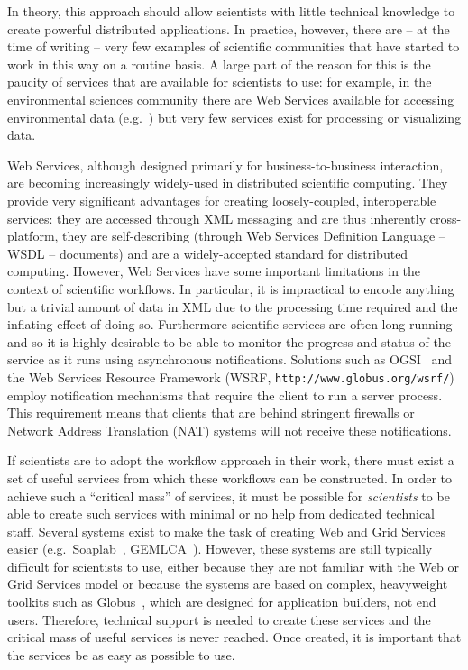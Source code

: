 \documentclass{llncs}
\begin{document}
In theory, this approach should allow scientists with little technical knowledge to create powerful distributed applications.  In practice, however, there are -- at the time of writing -- very few examples of scientific communities that have started to work in this way on a routine basis.  A large part of the reason for this is the paucity of services that are available for scientists to use: for example, in the environmental sciences community there are Web Services available for accessing environmental data (e.g.\ \cite{Woolf:2003}) but very few services exist for processing or visualizing data.

Web Services, although designed primarily for business-to-business interaction, are becoming increasingly widely-used in distributed scientific computing.  They provide very significant advantages for creating loosely-coupled, interoperable services: they are accessed through XML messaging and are thus inherently cross-platform, they are self-describing (through Web Services Definition Language -- WSDL -- documents) and are a widely-accepted standard for distributed computing.  However, Web Services have some important limitations in the context of scientific workflows. In particular, it is impractical to encode anything but a trivial amount of data in XML due to the processing time required and the inflating effect of doing so. Furthermore scientific services are often long-running and so it is highly desirable to be able to monitor the progress and status of the service as it runs using asynchronous notifications. Solutions such as OGSI~\cite{ogsi} and the Web Services Resource Framework (WSRF, {\tt http://www.globus.org/wsrf/}) employ notification mechanisms that require the client to run a server process. This requirement means that clients that are behind stringent firewalls or Network Address Translation (NAT) systems will not receive these notifications.

If scientists are to adopt the workflow approach in their work, there must exist a set of useful services from which these workflows can be constructed.  In order to achieve such a ``critical mass'' of services, it must be possible for {\em scientists\/} to be able to create such services with minimal or no help from dedicated technical staff.  Several systems exist to make the task of creating Web and Grid Services easier (e.g.\ Soaplab~\cite{soaplab}, GEMLCA~\cite{gemlca}).  However, these systems are still typically difficult for scientists to use, either because they are not familiar with the Web or Grid Services model or because the systems are based on complex, heavyweight toolkits such as Globus~\cite{globustoolkit}, which are designed for application builders, not end users.  Therefore, technical support is needed to create these services and the critical mass of useful services is never reached.  Once created, it is important that the services be as easy as possible to use.
\end{document}
